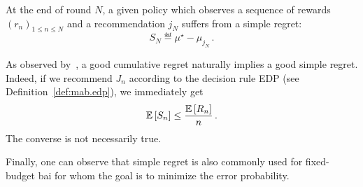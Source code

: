 \begin{definition}\label{def:mab.simple_regret}
\begin{leftbar}[defnbar]
	At the end of round $N$, a given policy which observes a sequence of rewards $(r_n)_{1 \leq n \leq N}$ and a recommendation $j_N$ suffers from a simple regret:
	\[
		S_N \eqdef \mu^{\star} - \mu_{j_N}\,.
	\]
\end{leftbar}
\end{definition}

\begin{remark}\label{remark:mab.simple}
\begin{leftbar}[remarkbar]
As observed by~\cite{bubeck2009pure}, a good cumulative regret naturally implies a good simple regret. Indeed, if we recommend $J_n$ according to the decision rule EDP (see Definition~\ref{def:mab.edp}), we immediately get 
\[
    \mathbb{E}\left[S_n\right] \leq \frac{\mathbb{E}\left[R_n\right]}{n}\,.
\]
The converse is not necessarily true.
\end{leftbar}
\end{remark}

Finally, one can observe that simple regret is also commonly used for fixed-budget \gls{bai} for whom the goal is to minimize the error probability.

